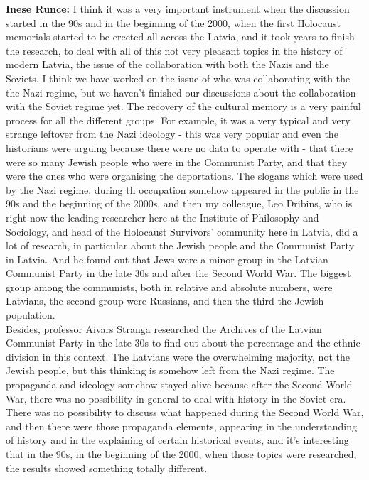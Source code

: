 \textbf{Inese Runce:} I think it was a very important instrument when the discussion started in the 90s and in the beginning of the 2000, when the first Holocaust memorials started to be erected all across the Latvia, and it took years to finish the research, to deal with all of this not very pleasant topics in the history of modern Latvia, the issue of the collaboration with both the Nazis and the Soviets. I think we have worked on the issue of who was collaborating with the the Nazi regime, but we haven’t finished our discussions about the collaboration with the Soviet regime yet.
The recovery of the cultural memory is a very painful process for all the different groups. For example, it was a very typical and very strange leftover from the Nazi ideology - this was very popular and even the historians were arguing because there were no data to operate with - that there were so many Jewish people who were in the Communist Party, and that they were the ones who were organising the deportations. The slogans which were used by the Nazi regime,  during th occupation somehow appeared in the public in the 90s and the beginning of the 2000s, and then my colleague, Leo Dribins, who is right now the leading researcher here at the Institute of Philosophy and Sociology, and head of the Holocaust Survivors' community here in Latvia, did a lot of research, in particular about the Jewish people and the Communist Party in Latvia. And he found out that Jews were a minor group in the Latvian Communist Party in the late 30s and after the Second World War. The biggest group among the communists, both in relative and absolute numbers, were Latvians, the second group were Russians, and then the third the Jewish population.\\
Besides, professor Aivars Stranga researched the Archives of the Latvian Communist Party in the late 30s to find out about the percentage and the ethnic division in this context. The Latvians were the overwhelming majority, not the Jewish people, but this thinking is somehow left from the Nazi regime. The propaganda and ideology somehow stayed alive because after the Second World War, there was no possibility in general to deal with history in the Soviet era. There was no possibility to discuss what happened during the Second World War, and then there were those propaganda elements, appearing in the understanding of history and in the explaining of certain historical events, and it's interesting that in the 90s, in the beginning of the 2000, when those topics were researched, the results showed something totally different.

